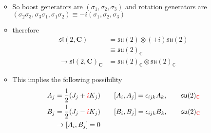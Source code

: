 \documentclass[../main.tex]{subfiles}
\begin{document}
\begin{itemize}
\begin{itemize}
\begin{align}
\end{align}
\item So boost generators are $(\sigma_1, \sigma_2, \sigma_3)$ and rotation generators are $(\sigma_2\sigma_3,\sigma_3\sigma_1,\sigma_1\sigma_2)\equiv-i(\sigma_1, \sigma_2, \sigma_3)$
\item therefore 
\begin{align}
\mathfrak{sl}(2,\mathbf{C})
&=\mathfrak{su}(2)\otimes (\pm i)\mathfrak{su}(2)\\
&\equiv\mathfrak{su}(2)_\mathbb{C}\\
\rightarrow
\mathfrak{sl}(2,\mathbf{C})_\mathbf{C}
&=\mathfrak{su}(2)_\mathbb{C}\otimes\mathfrak{su}(2)_\mathbb{C}
\end{align}
\item This implies the following possibility
\begin{align}
A_j&=\frac{1}{2}(J_j+\textcolor{red}{i}K_j)\qquad [A_i,A_j]=\epsilon_{ijk}A_k,\qquad\mathfrak{su}(2)_{\textcolor{red}{\mathbb{C}}}\\
B_j&=\frac{1}{2}(J_j-\textcolor{red}{i}K_j)\qquad [B_i,B_j]=\epsilon_{ijk}B_k,\qquad\mathfrak{su}(2)_{\textcolor{red}{\mathbb{C}}}\\
&\rightarrow [A_i,B_j]=0
\end{align}
 
\end{itemize}


\end{itemize}
\end{document}
